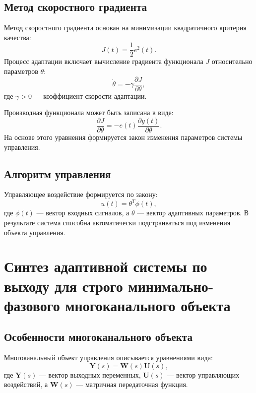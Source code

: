 \documentclass[a4paper,14pt]{extarticle} %
\begin{document}
\subsection*{Метод скоростного градиента}
Метод скоростного градиента основан на минимизации квадратичного критерия качества:
\begin{equation}
J(t) = \frac{1}{2}e^2(t).
\end{equation}
Процесс адаптации включает вычисление градиента функционала $J$ относительно параметров $\theta$:
\begin{equation}
\dot{\theta} = -\gamma \frac{\partial J}{\partial \theta},
\end{equation}
где $\gamma > 0$ — коэффициент скорости адаптации.

Производная функционала может быть записана в виде:
\begin{equation}
\frac{\partial J}{\partial \theta} = -e(t) \frac{\partial y(t)}{\partial \theta}.
\end{equation}
На основе этого уравнения формируется закон изменения параметров системы управления.

\subsection*{Алгоритм управления}
Управляющее воздействие формируется по закону:
\begin{equation}
u(t) = \theta^T \phi(t),
\end{equation}
где $\phi(t)$ — вектор входных сигналов, а $\theta$ — вектор адаптивных параметров. В результате система способна автоматически подстраиваться под изменения объекта управления.

\section{Синтез адаптивной системы по выходу для строго минимально-фазового многоканального объекта}
\subsection*{Особенности многоканального объекта}
Многоканальный объект управления описывается уравнениями вида:
\begin{equation}
\mathbf{Y}(s) = \mathbf{W}(s) \mathbf{U}(s),
\end{equation}
где $\mathbf{Y}(s)$ — вектор выходных переменных, $\mathbf{U}(s)$ — вектор управляющих воздействий, а $\mathbf{W}(s)$ — матричная передаточная функция.
\end{document}
